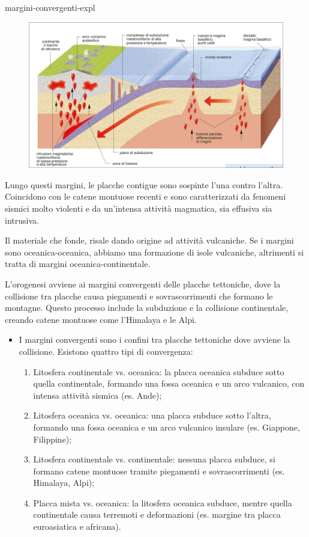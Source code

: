 \documentclass[preview]{standalone}
\begin{document}
\begin{snippet}{margini-convergenti-expl}
    \setlength{\intextsep}{0pt}%
    \begin{figure}
        \includegraphics[width=.55\textwidth]{resources/margini-convergenti.png}
    \end{figure}

    Lungo questi margini, le placche contigue sono sospinte l'una contro l'altra.
    Coincidono con le catene montuose recenti e sono caratterizzati da fenomeni sismici
    molto violenti e da un'intensa attività magmatica, sia effusiva sia intrusiva.

    Il materiale che fonde, risale dando origine ad attività vulcaniche.
    Se i margini sono oceanica-oceanica, abbiamo una formazione di isole vulcaniche,
    altrimenti si tratta di margini oceanica-continentale.

    L'orogenesi avviene ai margini convergenti delle placche tettoniche, dove la collisione tra
    placche causa piegamenti e sovrascorrimenti che formano le montagne. Questo processo include la
    subduzione e la collisione continentale, creando catene montuose come l'Himalaya e le Alpi.
    \wrapfill

    \begin{itemize}
        \item I margini convergenti sono i confini tra placche tettoniche dove avviene la collisione.
            Esistono quattro tipi di convergenza:
            \begin{enumerate}
                \item Litosfera continentale vs. oceanica: la placca oceanica subduce sotto quella
                    continentale, formando una fossa oceanica e un arco vulcanico, con intensa
                    attività sismica (es. Ande);
                \item Litosfera oceanica vs. oceanica: una placca subduce sotto l'altra, formando
                    una fossa oceanica e un arco vulcanico insulare (es. Giappone, Filippine);
                \item Litosfera continentale vs. continentale: nessuna placca subduce, si formano
                    catene montuose tramite piegamenti e sovrascorrimenti (es. Himalaya, Alpi);
                \item Placca mista vs. oceanica: la litosfera oceanica subduce, mentre quella
                    continentale causa terremoti e deformazioni (es. margine tra placca
                    euroasiatica e africana).
            \end{enumerate}
    \end{itemize}
\end{snippet}
\end{document}
